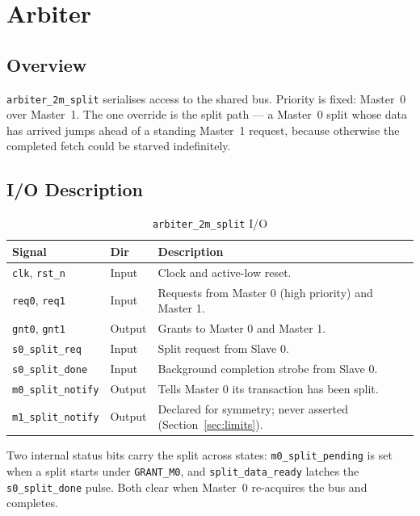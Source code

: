 \documentclass[11pt,a4paper]{article}
\newcommand{\sig}[1]{\texttt{#1}}
\begin{document}
\section{Arbiter}

\subsection{Overview}

\sig{arbiter\_2m\_split} serialises access to the shared bus. Priority is fixed:
Master~0 over Master~1. The one override is the split path --- a Master~0 split
whose data has arrived jumps ahead of a standing Master~1 request, because
otherwise the completed fetch could be starved indefinitely.

\subsection{I/O Description}

\begin{table}[htbp]
\centering
\caption{\sig{arbiter\_2m\_split} I/O}
\label{tab:io_arb}
\small
\begin{tabularx}{\textwidth}{llX}
\toprule
\textbf{Signal} & \textbf{Dir} & \textbf{Description} \\
\midrule
\sig{clk}, \sig{rst\_n}   & Input  & Clock and active-low reset. \\
\sig{req0}, \sig{req1}    & Input  & Requests from Master 0 (high priority) and Master 1. \\
\sig{gnt0}, \sig{gnt1}    & Output & Grants to Master 0 and Master 1. \\
\sig{s0\_split\_req}      & Input  & Split request from Slave 0. \\
\sig{s0\_split\_done}     & Input  & Background completion strobe from Slave 0. \\
\sig{m0\_split\_notify}   & Output & Tells Master 0 its transaction has been split. \\
\sig{m1\_split\_notify}   & Output & Declared for symmetry; never asserted (Section~\ref{sec:limits}). \\
\bottomrule
\end{tabularx}
\end{table}

Two internal status bits carry the split across states: \sig{m0\_split\_pending}
is set when a split starts under \sig{GRANT\_M0}, and \sig{split\_data\_ready}
latches the \sig{s0\_split\_done} pulse. Both clear when Master~0 re-acquires
the bus and completes.
\end{document}
